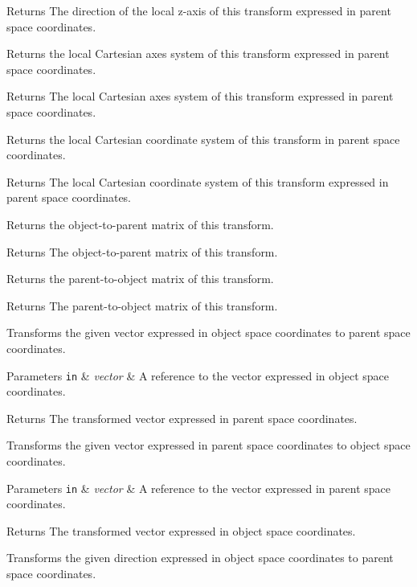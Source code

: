 \begin{DoxyReturn}{Returns}
The direction of the local z-\/axis of this transform expressed in parent space coordinates.
\end{DoxyReturn}
Returns the local Cartesian axes system of this transform expressed in parent space coordinates.

\begin{DoxyReturn}{Returns}
The local Cartesian axes system of this transform expressed in parent space coordinates.
\end{DoxyReturn}
Returns the local Cartesian coordinate system of this transform in parent space coordinates.

\begin{DoxyReturn}{Returns}
The local Cartesian coordinate system of this transform expressed in parent space coordinates.
\end{DoxyReturn}
Returns the object-\/to-\/parent matrix of this transform.

\begin{DoxyReturn}{Returns}
The object-\/to-\/parent matrix of this transform.
\end{DoxyReturn}
Returns the parent-\/to-\/object matrix of this transform.

\begin{DoxyReturn}{Returns}
The parent-\/to-\/object matrix of this transform.
\end{DoxyReturn}
Transforms the given vector expressed in object space coordinates to parent space coordinates.


\begin{DoxyParams}[1]{Parameters}
\mbox{\tt in}  & {\em vector} & A reference to the vector expressed in object space coordinates. \\
\hline
\end{DoxyParams}
\begin{DoxyReturn}{Returns}
The transformed vector expressed in parent space coordinates.
\end{DoxyReturn}
Transforms the given vector expressed in parent space coordinates to object space coordinates.


\begin{DoxyParams}[1]{Parameters}
\mbox{\tt in}  & {\em vector} & A reference to the vector expressed in parent space coordinates. \\
\hline
\end{DoxyParams}
\begin{DoxyReturn}{Returns}
The transformed vector expressed in object space coordinates.
\end{DoxyReturn}
Transforms the given direction expressed in object space coordinates to parent space coordinates.


